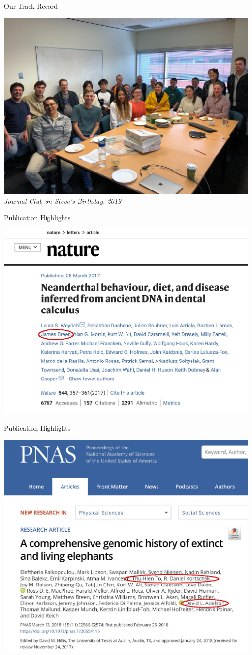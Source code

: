 \documentclass[11pt]{beamer}
\begin{document}
\begin{frame}{Our Track Record}

\small
\center
\includegraphics[width=0.75\linewidth]{figures/HubMeetingRoom.jpg}\\
\textit{Journal Club on Steve's Birthday, 2019}\\[1cm]

\end{frame}

\begin{frame}{Publication Highlights}

\center
\includegraphics[width=0.7\linewidth]{figures/Nature.jpg} \\[1cm]

\end{frame}

\begin{frame}{Publication Highlights}

\center
\includegraphics[width=0.7\linewidth]{figures/PNAS.jpg} \\[1cm]

\end{frame}
\end{document}

